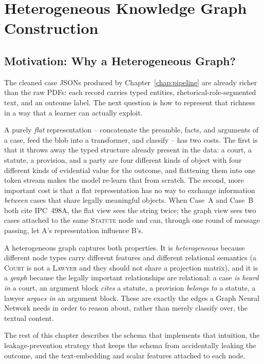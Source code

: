 \chapter{Heterogeneous Knowledge Graph Construction}
\label{chap:kg}

\section{Motivation: Why a Heterogeneous Graph?}
\label{sec:kg_motivation}

The cleaned case JSONs produced by Chapter~\ref{chap:pipeline} are
already richer than the raw PDFs: each record carries typed entities,
rhetorical-role-segmented text, and an outcome label. The next question
is how to represent that richness in a way that a learner can actually
exploit.

A purely \emph{flat} representation -- concatenate the preamble, facts,
and arguments of a case, feed the blob into a transformer, and
classify -- has two costs. The first is that it throws away the typed
structure already present in the data: a court, a statute, a provision,
and a party are four different kinds of object with four different
kinds of evidential value for the outcome, and flattening them into one
token stream makes the model re-learn that from scratch. The second,
more important cost is that a flat representation has no way to
exchange information \emph{between} cases that share legally meaningful
objects. When Case~A and Case~B both cite IPC~498A, the flat view sees
the string twice; the graph view sees two cases attached to the same
\textsc{Statute} node and can, through one round of message passing,
let A's representation influence B's.

A heterogeneous graph captures both properties. It is
\emph{heterogeneous} because different node types carry different
features and different relational semantics (a \textsc{Court} is not a
\textsc{Lawyer} and they should not share a projection matrix), and it
is a \emph{graph} because the legally important relationships are
relational: a case \emph{is heard in} a court, an argument block
\emph{cites} a statute, a provision \emph{belongs to} a statute, a
lawyer \emph{argues in} an argument block. These are exactly the edges
a Graph Neural Network needs in order to reason about, rather than
merely classify over, the textual content.

The rest of this chapter describes the schema that implements that
intuition, the leakage-prevention strategy that keeps the schema from
accidentally leaking the outcome, and the text-embedding and scalar
features attached to each node.

